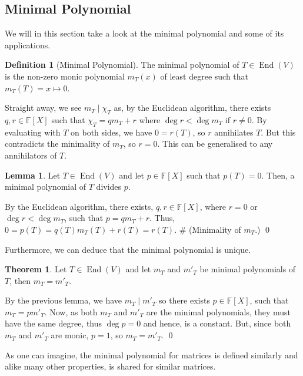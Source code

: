 \documentclass[
]{article}
\theoremstyle{definition}
\newtheorem{theorem}{Theorem}
\newtheorem{lemma}{Lemma}[section]
\theoremstyle{definition}
\newtheorem{definition}{Definition}[section]
\begin{document}
\hypertarget{minimal-polynomial}{%
\subsection{Minimal Polynomial}\label{minimal-polynomial}}

We will in this section take a look at the minimal polynomial and some
of its applications.

\begin{definition}[Minimal Polynomial]
  The minimal polynomial of \(T \in \mathop{\mathrm{End}}(V)\) is the non-zero monic polynomial 
  \(m_T(x)\) of least degree such that \(m_T(T) = x \mapsto 0\).
\end{definition}

Straight away, we see \(m_T \mid \chi_T\) as, by the Euclidean
algorithm, there exists \(q, r \in \mathbb{F}[X]\) such that
\(\chi_T = q m_T + r\) where \(\deg r < \deg m_T\) if \(r \neq 0\). By
evaluating with \(T\) on both sides, we have \(0 = r(T)\), so \(r\)
annihilates \(T\). But this contradicts the minimality of \(m_T\), so
\(r = 0\). This can be generalised to any annihilators of \(T\).

\begin{lemma}
  Let \(T \in \mathop{\mathrm{End}}(V)\) and let \(p \in \mathbb{F}[X]\) such that \(p(T) = 0\). 
  Then, a minimal polynomial of \(T\) divides \(p\). 
\end{lemma}
\proof

By the Euclidean algorithm, there exists, \(q, r \in \mathbb{F}[X]\),
where \(r = 0\) or \(\deg r < \deg m_T\), such that \(p = qm_T + r\).
Thus, \(0 = p(T) = q(T) m_T(T) + r(T) = r(T)\). \# (Minimality of
\(m_T\).) \qed

Furthermore, we can deduce that the minimal polynomial is unique.

\begin{theorem}
  Let \(T \in \mathop{\mathrm{End}}(V)\) and let \(m_T\) and \(m'_T\) be minimal polynomials of 
  \(T\), then \(m_T = m'_T\).
\end{theorem}
\proof

By the previous lemma, we have \(m_T \mid m'_T\) so there exists
\(p \in \mathbb{F}[X]\), such that \(m_T = p m'_T\). Now, as both
\(m_T\) and \(m'_T\) are the minimal polynomials, they must have the
same degree, thus \(\deg p = 0\) and hence, is a constant. But, since
both \(m_T\) and \(m'_T\) are monic, \(p = 1\), so \(m_T = m'_T\). \qed

As one can imagine, the minimal polynomial for matrices is defined
similarly and alike many other properties, is shared for similar
matrices.
\end{document}
